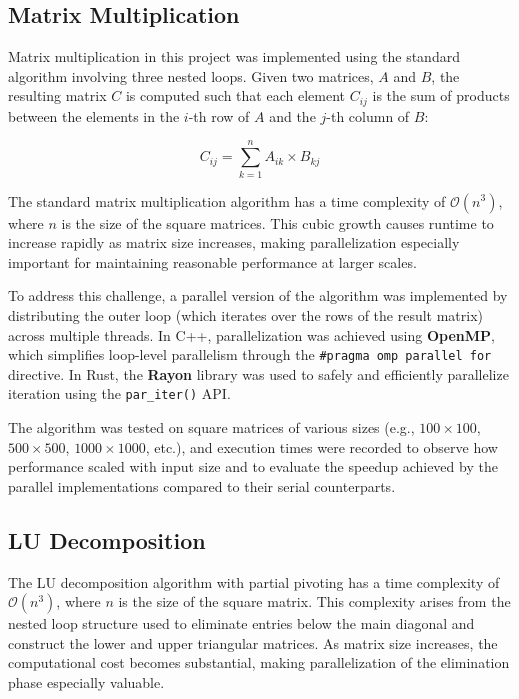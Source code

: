 \documentclass[12pt]{article}
\begin{document}
\subsection*{Matrix Multiplication}

Matrix multiplication in this project was implemented using the standard algorithm involving three nested loops. Given two matrices, \( A \) and \( B \),
the resulting matrix \( C \) is computed such that each element \( C_{ij} \) is the sum of products between the elements in the \( i \)-th row of \( A \)
and the \( j \)-th column of \( B \):

\[
    C_{ij} = \sum_{k=1}^{n} A_{ik} \times B_{kj}
\]

The standard matrix multiplication algorithm has a time complexity of \( \mathcal{O}(n^3) \), where \( n \) is the size of the square matrices.
This cubic growth causes runtime to increase rapidly as matrix size increases, making parallelization especially important for maintaining reasonable
performance at larger scales.

To address this challenge, a parallel version of the algorithm was implemented by distributing the outer loop (which iterates over the rows of the
result matrix) across multiple threads. In C++, parallelization was achieved using \textbf{OpenMP}, which simplifies loop-level parallelism through
the \texttt{\#pragma omp parallel for} directive. In Rust, the \textbf{Rayon} library was used to safely and efficiently parallelize iteration using
the \texttt{par\_iter()} API.

The algorithm was tested on square matrices of various sizes (e.g., \(100 \times 100\), \(500 \times 500\), \(1000 \times 1000\), etc.), and execution
times were recorded to observe how performance scaled with input size and to evaluate the speedup achieved by the parallel implementations compared to
their serial counterparts.

\subsection*{LU Decomposition}
The LU decomposition algorithm with partial pivoting has a time complexity of \( \mathcal{O}(n^3) \), where \( n \) is the size of the square matrix.
This complexity arises from the nested loop structure used to eliminate entries below the main diagonal and construct the lower and upper triangular matrices.
As matrix size increases, the computational cost becomes substantial, making parallelization of the elimination phase especially valuable.
\end{document}
